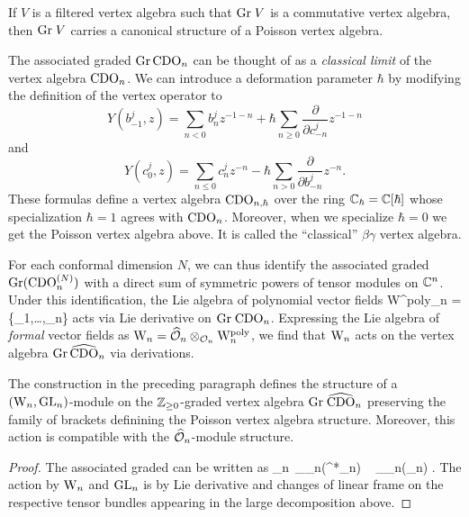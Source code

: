 \begin{prop}
If $V$ is a filtered vertex algebra such that ${\rm Gr} \; V$ is a commutative vertex algebra,
then ${\rm Gr} \; V$ carries a canonical structure of a Poisson vertex algebra.
\end{prop}

\begin{rmk} 
The associated graded ${\rm Gr}\, {\rm CDO}_n$ can be thought of as a {\em classical limit} of the vertex algebra ${\rm CDO}_n$. 
We can introduce a deformation parameter $\hbar$ by modifying the definition of the vertex operator to
\[
Y(b^j_{-1},z) = \sum_{n < 0} b_n^j z^{-1-n} + \hbar \sum_{n \ge 0} \frac{\partial}{\partial c_{-n}^j} z^{-1-n} 
\]
and 
\[
Y(c_{0}^j,z) = \sum_{n \le 0} c^j_n z^{-n} - \hbar \sum_{n > 0}  \frac{\partial}{\partial b_{-n}^j} z^{-n}.
\]
These formulas define a vertex algebra ${\rm CDO}_{n,\hbar}$ over the ring $\mathbb C_\hbar = \mathbb C [ \hbar]$ whose specialization $\hbar = 1$ agrees with ${\rm CDO}_n$. 
Moreover, when we specialize $\hbar = 0$ we get the Poisson vertex algebra above. 
It is called the ``classical'' $\beta\gamma$ vertex algebra.
\end{rmk}

For each conformal dimension $N$, we can thus identify the associated graded ${\rm Gr}({\rm CDO}_n^{(N)})$ with a direct sum of symmetric powers of tensor modules on $\mathbb C^n$. Under this identification, the Lie algebra of polynomial vector fields 
\ben
{\rm W}^{\rm poly}_n = \CC[t^1,\ldots,t^n]\{\partial_1,\ldots,\partial_n\}
\een
acts via Lie derivative on ${\rm Gr} \; {\rm CDO}_n$. Expressing the Lie algebra of
{\em formal} vector fields as ${{\rm W}_n} = \widehat{\mathcal O}_n \otimes_{\mathcal O_n} {\rm
  W}_n^{\rm poly}$, we find that ${{\rm W}_n}$ acts on the vertex algebra
${\rm Gr} \, \widehat{\rm CDO}_n$ via derivations.

\begin{prop} \label{grcdo}
The construction in the preceding paragraph defines the structure of a $({{\rm W}_n}, {\rm GL}_n)$-module on the $\mathbb Z_{\geq 0}$-graded vertex algebra ${\rm Gr} \; \widehat{\rm CDO}_n$ preserving the family of brackets definining the Poisson vertex algebra structure. Moreover, this action is compatible with the $\widehat{\mathcal O}_n$-module structure. 
\end{prop}

\begin{proof} The associated graded can be written as 
\ben
\Gr \; \hCDO_n \cong
{}\,\cSym_{\hO_n}(\hT^*_n)\,
\widehat{\otimes}\, \,\cSym_{\hO_n}(\hT_n) .
\een
The action by ${{\rm W}_n}$ and ${\rm GL}_n$ is by Lie derivative and changes of
linear
frame on the respective tensor
bundles appearing in the large decomposition above. 
\end{proof}

